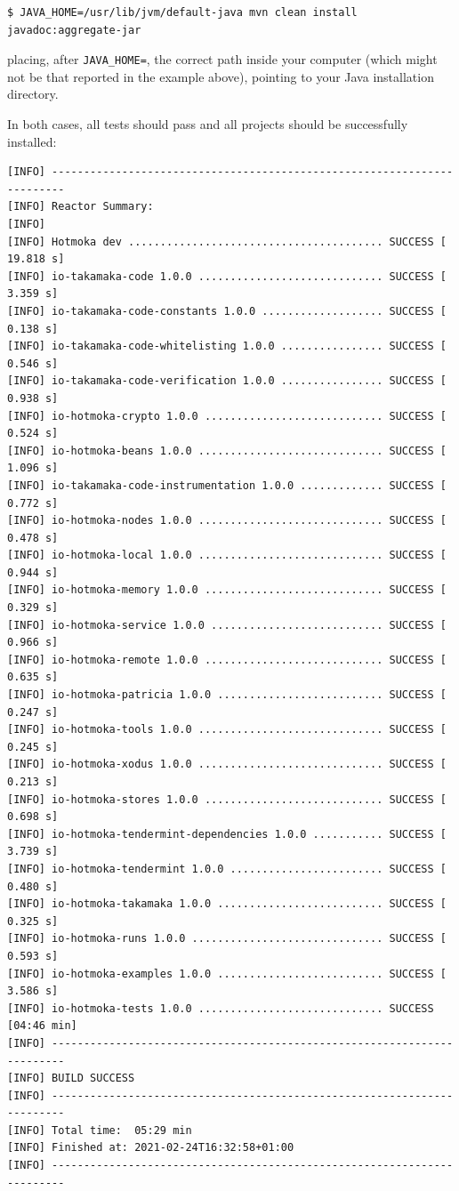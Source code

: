 \documentclass[a4paper,]{book}
\begin{document}
{\begin{myverbatim}
\begin{verbatim}
$ JAVA_HOME=/usr/lib/jvm/default-java mvn clean install javadoc:aggregate-jar
\end{verbatim}
\end{myverbatim}

placing, after \texttt{JAVA\_HOME=}, the correct path inside your
computer (which might not be that reported in the example above),
pointing to your Java installation directory.

In both cases, all tests should pass and all projects should be
successfully installed:

\begin{myverbatim}
\begin{verbatim}
[INFO] ------------------------------------------------------------------------
[INFO] Reactor Summary:
[INFO] 
[INFO] Hotmoka dev ........................................ SUCCESS [ 19.818 s]
[INFO] io-takamaka-code 1.0.0 ............................. SUCCESS [  3.359 s]
[INFO] io-takamaka-code-constants 1.0.0 ................... SUCCESS [  0.138 s]
[INFO] io-takamaka-code-whitelisting 1.0.0 ................ SUCCESS [  0.546 s]
[INFO] io-takamaka-code-verification 1.0.0 ................ SUCCESS [  0.938 s]
[INFO] io-hotmoka-crypto 1.0.0 ............................ SUCCESS [  0.524 s]
[INFO] io-hotmoka-beans 1.0.0 ............................. SUCCESS [  1.096 s]
[INFO] io-takamaka-code-instrumentation 1.0.0 ............. SUCCESS [  0.772 s]
[INFO] io-hotmoka-nodes 1.0.0 ............................. SUCCESS [  0.478 s]
[INFO] io-hotmoka-local 1.0.0 ............................. SUCCESS [  0.944 s]
[INFO] io-hotmoka-memory 1.0.0 ............................ SUCCESS [  0.329 s]
[INFO] io-hotmoka-service 1.0.0 ........................... SUCCESS [  0.966 s]
[INFO] io-hotmoka-remote 1.0.0 ............................ SUCCESS [  0.635 s]
[INFO] io-hotmoka-patricia 1.0.0 .......................... SUCCESS [  0.247 s]
[INFO] io-hotmoka-tools 1.0.0 ............................. SUCCESS [  0.245 s]
[INFO] io-hotmoka-xodus 1.0.0 ............................. SUCCESS [  0.213 s]
[INFO] io-hotmoka-stores 1.0.0 ............................ SUCCESS [  0.698 s]
[INFO] io-hotmoka-tendermint-dependencies 1.0.0 ........... SUCCESS [  3.739 s]
[INFO] io-hotmoka-tendermint 1.0.0 ........................ SUCCESS [  0.480 s]
[INFO] io-hotmoka-takamaka 1.0.0 .......................... SUCCESS [  0.325 s]
[INFO] io-hotmoka-runs 1.0.0 .............................. SUCCESS [  0.593 s]
[INFO] io-hotmoka-examples 1.0.0 .......................... SUCCESS [  3.586 s]
[INFO] io-hotmoka-tests 1.0.0 ............................. SUCCESS [04:46 min]
[INFO] ------------------------------------------------------------------------
[INFO] BUILD SUCCESS
[INFO] ------------------------------------------------------------------------
[INFO] Total time:  05:29 min
[INFO] Finished at: 2021-02-24T16:32:58+01:00
[INFO] ------------------------------------------------------------------------
\end{verbatim}
\end{myverbatim}

}
\end{document}
